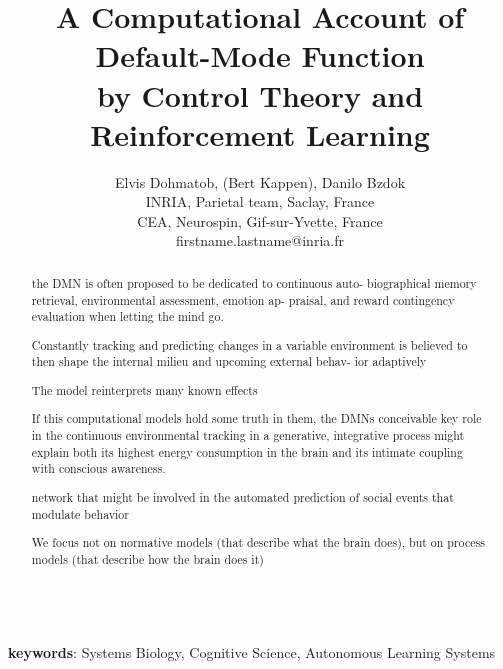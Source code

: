 \documentclass{article} %
\title{A Computational Account of Default-Mode Function\\by Control Theory and Reinforcement Learning}
\begin{document}
\author{Elvis Dohmatob, (Bert Kappen), Danilo Bzdok\\
  INRIA, Parietal team, Saclay, France\\
  CEA, Neurospin, Gif-sur-Yvette, France\\
  firstname.lastname@inria.fr}

\maketitle


\begin{abstract}

the DMN is often proposed to be dedicated to continuous auto- biographical memory retrieval, environmental assessment, emotion ap- praisal, and reward contingency evaluation when letting the mind go.

Constantly tracking and predicting changes in a variable environment is believed to then shape the internal milieu and upcoming external behav- ior adaptively

The model reinterprets many known effects

If this computational models hold some truth in them, the DMNs conceivable key role in the continuous environmental tracking in a generative, integrative process might explain both its highest energy consumption in the brain and its intimate coupling with conscious awareness.

network that might be involved in the automated prediction of social events that modulate behavior

We focus not on normative models (that describe what the brain does), but on process models (that describe how the brain does it)

\end{abstract}

\textbf{\\keywords}: Systems Biology, Cognitive Science, Autonomous Learning Systems

\tableofcontents
\end{document}

